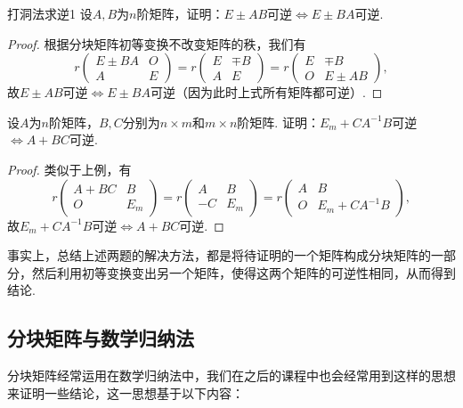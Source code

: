 \begin{example}{}{打洞法求逆1}
    设$A,B$为$n$阶矩阵，证明：$E\pm AB$可逆$\iff E\pm BA$可逆.
\end{example}

\begin{proof}
    根据分块矩阵初等变换不改变矩阵的秩，我们有
    \[r\begin{pmatrix}
            E\pm BA & O \\ A & E
        \end{pmatrix}=r\begin{pmatrix}
            E & \mp B \\ A & E
        \end{pmatrix}=r\begin{pmatrix}
            E & \mp B \\ O & E\pm AB
        \end{pmatrix},\]
    故$E\pm AB$可逆$\iff E\pm BA$可逆（因为此时上式所有矩阵都可逆）.
\end{proof}

\begin{example}{}{}
    设$A$为$n$阶矩阵，$B,C$分别为$n \times m$和$m \times n$阶矩阵. 证明：$E_m+CA^{-1}B$可逆$\iff A+BC$可逆.
\end{example}

\begin{proof}
    类似于上例，有
    \[r\begin{pmatrix}
            A+BC & B \\ O & E_m
        \end{pmatrix}=r\begin{pmatrix}
            A & B \\ -C & E_m
        \end{pmatrix}=r\begin{pmatrix}
            A & B \\ O & E_m+CA^{-1}B
        \end{pmatrix},\]
    故$E_m+CA^{-1}B$可逆$\iff A+BC$可逆.
\end{proof}

事实上，总结上述两题的解决方法，都是将待证明的一个矩阵构成分块矩阵的一部分，然后利用初等变换变出另一个矩阵，使得这两个矩阵的可逆性相同，从而得到结论.

\subsection{分块矩阵与数学归纳法}

分块矩阵经常运用在数学归纳法中，我们在之后的课程中也会经常用到这样的思想来证明一些结论，这一思想基于以下内容：

